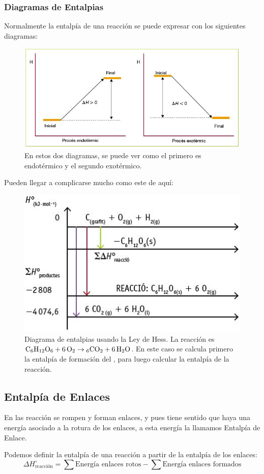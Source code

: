\documentclass[arial,a4paper,print]{article}
\begin{document}
\subsubsection{Diagramas de Entalpias}
Normalmente la entalpía de una reacción se puede expresar con los siguientes diagramas:
\begin{figure}[H]
	\centering
	\includegraphics[width=0.5\linewidth]{figures/diagrama_H}
	\caption{En estos dos diagramas, se puede ver como el primero es endotérmico y el segundo exotérmico.}
	\label{fig:diagramah}
\end{figure}
Pueden llegar a complicarse mucho como este de aquí:
\begin{figure}[H]
	\centering
	\includegraphics[width=0.5\linewidth]{figures/diagrama2_h}
	\caption{Diagrama de entalpias usando la Ley de Hess. La reacción es $\ce{C_{6}H_{12}O_{6} + 6O_{2}\rightarrow 6CO_{2} + 6H_{2}O}$. En este caso se calcula primero la entalpía de formación del , para luego calcular la entalpía de la reacción.}
	\label{fig:diagrama2h}
\end{figure}
\pagebreak

\subsection{Entalpía de Enlaces}
En las reacción se rompen y forman enlaces, y pues tiene sentido que haya una energía asociado a la rotura de los enlaces, a esta energía la llamamos Entalpía de Enlace. 

Podemos definir la entalpía de una reacción a partir de la entalpía de los enlaces:
\begin{equation*}
	\Delta H^{\circ}_{\text{reacción}} = \sum \text{Energía enlaces rotos} - \sum\text{Energía enlaces formados}
\end{equation*}
\end{document}
